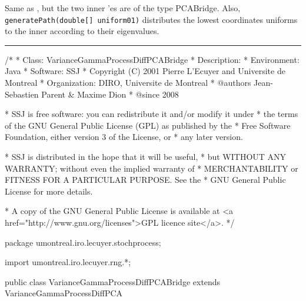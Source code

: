 
Same as , but the two
inner 'es are of the type PCABridge.
Also, \texttt{generatePath(double[] uniform01)} distributes the
lowest coordinates uniforms to the inner
 according to their eigenvalues.

\bigskip\hrule\bigskip

\begin{code}
\begin{hide}
/*
 * Class:        VarianceGammaProcessDiffPCABridge
 * Description:
 * Environment:  Java
 * Software:     SSJ
 * Copyright (C) 2001  Pierre L'Ecuyer and Universite de Montreal
 * Organization: DIRO, Universite de Montreal
 * @authors      Jean-Sebastien Parent & Maxime Dion
 * @since        2008

 * SSJ is free software: you can redistribute it and/or modify it under
 * the terms of the GNU General Public License (GPL) as published by the
 * Free Software Foundation, either version 3 of the License, or
 * any later version.

 * SSJ is distributed in the hope that it will be useful,
 * but WITHOUT ANY WARRANTY; without even the implied warranty of
 * MERCHANTABILITY or FITNESS FOR A PARTICULAR PURPOSE.  See the
 * GNU General Public License for more details.

 * A copy of the GNU General Public License is available at
   <a href="http://www.gnu.org/licenses">GPL licence site</a>.
 */
\end{hide}
package umontreal.iro.lecuyer.stochprocess;\begin{hide}
import umontreal.iro.lecuyer.rng.*;

\end{hide}

public class VarianceGammaProcessDiffPCABridge extends
                                               VarianceGammaProcessDiffPCA \begin{hide} {

\end{hide}
\end{code}
